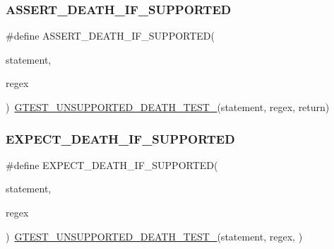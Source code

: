 \subsubsection{\texorpdfstring{A\+S\+S\+E\+R\+T\+\_\+\+D\+E\+A\+T\+H\+\_\+\+I\+F\+\_\+\+S\+U\+P\+P\+O\+R\+T\+ED}{ASSERT\_DEATH\_IF\_SUPPORTED}}
{\footnotesize\ttfamily \#define A\+S\+S\+E\+R\+T\+\_\+\+D\+E\+A\+T\+H\+\_\+\+I\+F\+\_\+\+S\+U\+P\+P\+O\+R\+T\+ED(\begin{DoxyParamCaption}\item[{}]{statement,  }\item[{}]{regex }\end{DoxyParamCaption})~\hyperlink{gtest-death-test-internal_8h_a29a145cda8bd2d0c6a78b0ac1d670d18}{G\+T\+E\+S\+T\+\_\+\+U\+N\+S\+U\+P\+P\+O\+R\+T\+E\+D\+\_\+\+D\+E\+A\+T\+H\+\_\+\+T\+E\+S\+T\+\_\+}(statement, regex, return)}

\mbox{\label{gtest-death-test_8h_a8564de0e012dd0898949c513d1571f8b}} 
\subsubsection{\texorpdfstring{E\+X\+P\+E\+C\+T\+\_\+\+D\+E\+A\+T\+H\+\_\+\+I\+F\+\_\+\+S\+U\+P\+P\+O\+R\+T\+ED}{EXPECT\_DEATH\_IF\_SUPPORTED}}
{\footnotesize\ttfamily \#define E\+X\+P\+E\+C\+T\+\_\+\+D\+E\+A\+T\+H\+\_\+\+I\+F\+\_\+\+S\+U\+P\+P\+O\+R\+T\+ED(\begin{DoxyParamCaption}\item[{}]{statement,  }\item[{}]{regex }\end{DoxyParamCaption})~\hyperlink{gtest-death-test-internal_8h_a29a145cda8bd2d0c6a78b0ac1d670d18}{G\+T\+E\+S\+T\+\_\+\+U\+N\+S\+U\+P\+P\+O\+R\+T\+E\+D\+\_\+\+D\+E\+A\+T\+H\+\_\+\+T\+E\+S\+T\+\_\+}(statement, regex, )}

